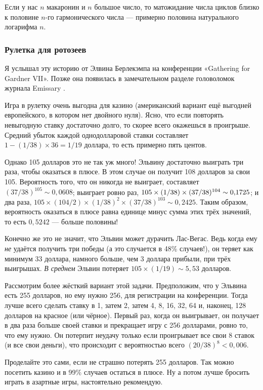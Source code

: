 Если у нас $n$ макаронин и $n$ большое число, то матожидание числа циклов близко к половине $n$-го гармонического числа --- примерно половина натурального логарифма $n$.

\subsubsection*{Рулетка для ротозеев}

Я услышал эту историю от Элвина Берлекэмпа на конференции
«Gathering for Gardner VII».
Позже она появилась в замечательном разделе головоломок журнала Emissary \cite[весна/осень 2006 года]{3}.

Игра в рулетку очень выгодна для казино (американский вариант ещё выгодней европейского, в котором нет двойного нуля).
Ясно, что если повторять невыгодную ставку достаточно долго, то скорее всего окажешься в проигрыше.
Средний убыток каждой однодолларовой ставки составляет $1 - (1/38) \times 36 = 1/19$ доллара, то есть примерно пять центов.

Однако 105 долларов это не так уж много!
Эльвину достаточно выиграть три раза, чтобы оказаться в плюсе.
В этом случае он получит 108 долларов за свои 105.
Вероятность того, что он никогда не выиграет, составляет $(37/38)^{105} \sim 0{,}0608$;
выиграет ровно раз, $105 \times (1/38) \times (37/38)^{104} \z\sim 0{,}1725$;
и два раза, $105 \times (104/2) \times (1/38)^2 \times (37/38)^{103} \sim 0{,}2425$.
Таким образом, вероятность оказаться в плюсе равна единице минус сумма этих трёх значений, то есть $0{,}5242$ --- больше половины!

Конечно же это не значит, что Эльвин может дурачить Лас-Вегас.
Ведь когда ему \emph{не} удаётся получить три победы (а это случается в 48\% случаев!), он теряет как минимум 33 доллара, намного больше, чем 3 доллара прибыли, при трёх выигрышах.
\emph{В среднем} Эльвин потеряет $105 \times (1/19) \sim 5{,}53$ долларов.

Рассмотрим более жёсткий вариант этой задачи.
Предположим, что у Эльвина есть 255 долларов, но ему нужно 256, для регистрации на конференции.
Тогда лучше всего сделать ставку в 1, затем 2, затем 4, 8, 16, 32, 64 и, наконец, 128 долларов на красное (или чёрное).
Первый раз, когда он выигрывает, он получает в два раза больше своей ставки и прекращает игру с 256 долларами, ровно то, что ему нужно.
Он потерпит неудачу только если проигрывает все свои $8$ ставок (и все свои деньги), что происходит с вероятностью всего $(20/38)^8 < 0{,}006$.

Проделайте это сами, если не страшно потерять 255 долларов.
Так можно посетить казино и в 99\% случаев остаться в плюсе.
Ну а потом лучше бросить играть в азартные игры, настоятельно рекомендую.
